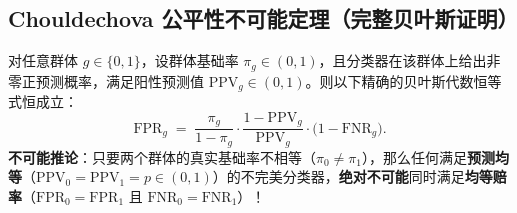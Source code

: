 \subsection{Chouldechova 公平性不可能定理（完整贝叶斯证明）}

\begin{thmBox}
\begin{theorem}\label{thm:chouldechova}
对任意群体 $g \in \{0, 1\}$，设群体基础率 $\pi_g \in (0, 1)$，且分类器在该群体上给出非零正预测概率，满足阳性预测值 $\mathrm{PPV}_g \in (0, 1)$。则以下精确的贝叶斯代数恒等式恒成立：
\begin{equation}\label{eq:chouldechova-id}
  \mathrm{FPR}_g \;=\; \frac{\pi_g}{1 - \pi_g}\cdot \frac{1 - \mathrm{PPV}_g}{\mathrm{PPV}_g}\cdot \big(1 - \mathrm{FNR}_g\big).
\end{equation}
\textbf{不可能推论}：只要两个群体的真实基础率不相等（$\pi_0 \neq \pi_1$），那么任何满足\textbf{预测均等}（$\mathrm{PPV}_0 = \mathrm{PPV}_1 = p \in (0, 1)$）的不完美分类器，\textbf{绝对不可能}同时满足\textbf{均等赔率}（$\mathrm{FPR}_0 = \mathrm{FPR}_1$ 且 $\mathrm{FNR}_0 = \mathrm{FNR}_1$）！
\end{theorem}
\end{thmBox}

